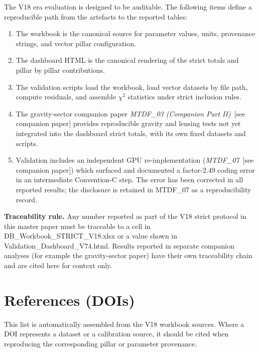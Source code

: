\documentclass[11pt,a4paper]{article}
\begin{document}
The V18 era evaluation is designed to be auditable. The following items define a reproducible path from the artefacts to the reported tables:

\begin{enumerate}
  \item The workbook is the canonical source for parameter values, units, provenance strings, and vector pillar configuration.
  \item The dashboard HTML is the canonical rendering of the strict totals and pillar by pillar contributions.
  \item The validation scripts load the workbook, load vector datasets by file path, compute residuals, and assemble $\chi$$^{2}$ statistics under strict inclusion rules.
  \item The gravity-sector companion paper \textit{MTDF\_\allowbreak{}03 (Companion Part II)}~[see companion paper] provides reproducible gravity and lensing tests not yet integrated into the dashboard strict totals, with its own fixed datasets and scripts.
  \item Validation includes an independent GPU re-implementation (\textit{MTDF\_\allowbreak{}07}~[see companion paper]) which surfaced and documented a factor-2.49 coding error in an intermediate Convention-C step. The error has been corrected in all reported results; the disclosure is retained in MTDF\_\allowbreak{}07 as a reproducibility record.
\end{enumerate}

\begin{mdframed}[linecolor=accent,linewidth=0.5pt,backgroundcolor=callout-bg,leftline=true,rightline=true,topline=true,bottomline=true,innerleftmargin=8pt,innerrightmargin=8pt,innertopmargin=6pt,innerbottommargin=6pt]
\textbf{Traceability rule.} Any number reported as part of the V18 strict protocol in this master paper must be traceable to a cell in DB\_\allowbreak{}Workbook\_\allowbreak{}STRICT\_\allowbreak{}V18.xlsx or a value shown in Validation\_\allowbreak{}Dashboard\_\allowbreak{}V74.html. Results reported in separate companion analyses (for example the gravity-sector paper) have their own traceability chain and are cited here for context only.
\end{mdframed}

\section{References (DOIs)}
\label{sec:sec12}
This list is automatically assembled from the V18 workbook sources. Where a DOI represents a dataset or a calibration source, it should be cited when reproducing the corresponding pillar or parameter provenance.
\end{document}
